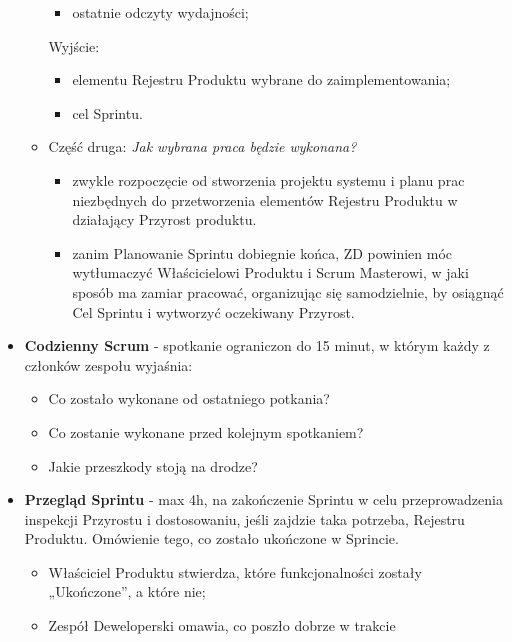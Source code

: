 \documentclass[a4paper]{article}
\begin{document}
\begin{itemize}
\begin{itemize}
\begin{itemize}
                \item ostatnie odczyty wydajności;
            \end{itemize}
            Wyjście:
            \begin{itemize}
                \item elementu Rejestru Produktu
                wybrane do zaimplementowania;
                \item cel Sprintu.
            \end{itemize}
            \item Część druga: \textit{Jak wybrana praca będzie wykonana?}\\
            \begin{itemize}
                \item zwykle rozpoczęcie od stworzenia projektu systemu i planu prac
               niezbędnych do przetworzenia elementów Rejestru Produktu w działający Przyrost produktu.
                \item zanim Planowanie Sprintu dobiegnie końca, ZD powinien móc wytłumaczyć Właścicielowi
            Produktu i Scrum Masterowi, w jaki sposób ma zamiar pracować, organizując się samodzielnie, by osiągnąć Cel
            Sprintu i wytworzyć oczekiwany Przyrost.
            \end{itemize}
        \end{itemize}
        \item \textbf{Codzienny Scrum} - spotkanie ograniczon do 15 minut, w którym każdy z
        członków zespołu wyjaśnia:
        \begin{itemize}
            \item Co zostało wykonane od ostatniego potkania?
            \item Co zostanie wykonane przed kolejnym spotkaniem?
            \item Jakie przeszkody stoją na drodze?
        \end{itemize}
        \item \textbf{Przegląd Sprintu} - max 4h, na zakończenie
        Sprintu w celu przeprowadzenia inspekcji Przyrostu i dostosowaniu, jeśli zajdzie taka
        potrzeba, Rejestru Produktu. Omówienie tego, co zostało ukończone w Sprincie.
        \begin{itemize}
            \item Właściciel Produktu stwierdza, które funkcjonalności zostały
            „Ukończone”, a które nie;
            \item Zespół Deweloperski omawia, co poszło dobrze w trakcie

\end{itemize}
\end{itemize}
\end{document}

